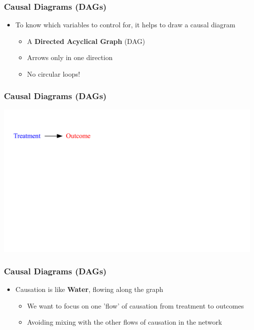 \documentclass[xcolor=x11names,compress]{beamer}\usepackage[]{graphicx}\usepackage[]{color}
\newenvironment{knitrout}{}{} %
\renewcommand{\(}{\begin{columns}}
\renewcommand{\)}{\end{columns}}
\newcommand{\<}[1]{\begin{column}{#1}}
\renewcommand{\>}{\end{column}}
\begin{document}
\begin{frame}
\frametitle{Causal Diagrams (DAGs)}
\begin{itemize}
\item To know which variables to control for, it helps to draw a causal diagram
\pause
\begin{itemize}
\item A \textbf{Directed Acyclical Graph} (DAG)
\pause
\item Arrows only in one direction
\pause
\item No circular loops!
\end{itemize}
\end{itemize}
\end{frame}

\begin{frame}
\frametitle{Causal Diagrams (DAGs)}
\begin{knitrout}
\color{fgcolor}
\includegraphics[width=1.8\linewidth]{figure/Dag1-1} 

\end{knitrout}
\end{frame}

\begin{frame}
\frametitle{Causal Diagrams (DAGs)}
\begin{itemize}
\item Causation is like \textbf{Water}, flowing along the graph
\begin{itemize}
\item We want to focus on one 'flow' of causation from treatment to outcomes
\pause
\item Avoiding mixing with the other flows of causation in the network
\end{itemize}
\end{itemize}
\end{frame}
\end{document}

